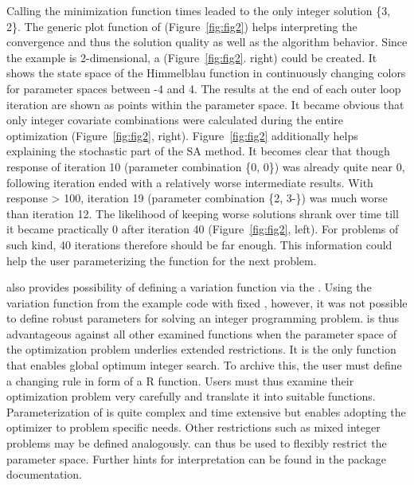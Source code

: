 Calling the minimization function times leaded to the only integer solution \{3, 2\}. The generic plot function of  (Figure~\ref{fig:fig2}) helps interpreting the convergence and thus the solution quality as well as the algorithm behavior. Since the example is 2-dimensional, a  (Figure~\ref{fig:fig2}. right) could be created. It shows the state space of the Himmelblau function in continuously changing colors for parameter spaces between -4 and 4. The results at the end of each outer loop iteration are shown as points within the parameter space. It became obvious that only integer covariate combinations were calculated during the entire optimization (Figure~\ref{fig:fig2}, right). Figure~\ref{fig:fig2} additionally helps explaining the stochastic part of the SA method. It becomes clear that though response of iteration 10 (parameter combination \{0, 0\}) was already quite near 0, following iteration ended with a relatively worse intermediate results. With response > 100, iteration 19 (parameter combination \{2, 3-\}) was much worse than iteration 12. The likelihood of keeping worse solutions shrank over time till it became practically 0 after iteration 40 (Figure~\ref{fig:fig2}, left). For problems of such kind, 40 iterations therefore should be far enough. This information could help the user parameterizing the function for the next problem.

 also provides possibility of defining a variation function via the . Using the variation function from the example code with fixed , however, it was not possible to define robust parameters for solving an integer programming problem.  is thus advantageous against all other examined functions when the parameter space of the optimization problem underlies extended restrictions. It is the only function that enables global optimum integer search. To archive this, the user must define a changing rule in form of a R function. Users must thus examine their optimization problem very carefully and translate it into suitable functions. Parameterization of  is quite complex and time extensive but enables adopting the optimizer to problem specific needs. Other restrictions such as mixed integer problems may be defined analogously.  can thus be used to flexibly restrict the parameter space. Further hints for interpretation can be found in the package documentation.

